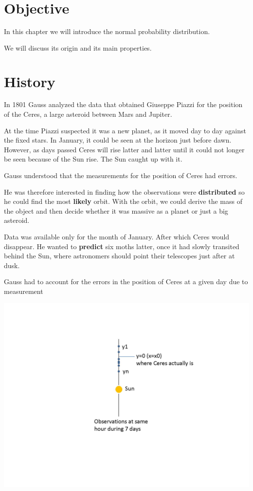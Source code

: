 \documentclass[
]{book}
\begin{document}
\hypertarget{objective-4}{%
\section{Objective}\label{objective-4}}

In this chapter we will introduce the normal probability distribution.

We will discuss its origin and its main properties.

\hypertarget{history}{%
\section{History}\label{history}}

In 1801 Gauss analyzed the data that obtained Giuseppe Piazzi for the position of the Ceres, a large asteroid between Mars and Jupiter.

At the time Piazzi suspected it was a new planet, as it moved day to day against the fixed stars. In January, it could be seen at the horizon just before dawn. However, as days passed Ceres will rise latter and latter until it could not longer be seen because of the Sun rise. The Sun caught up with it.

Gauss understood that the measurements for the position of Ceres had errors.

He was therefore interested in finding how the observations were \textbf{distributed} so he could find the most \textbf{likely} orbit. With the orbit, we could derive the mass of the object and then decide whether it was massive as a planet or just a big asteroid.

Data was available only for the month of January. After which Ceres would disappear. He wanted to \textbf{predict} six moths latter, once it had slowly transited behind the Sun, where astronomers should point their telescopes just after at dusk.

Gauss had to account for the errors in the position of Ceres at a given day due to measurement

\includegraphics{./figures/ceres.JPG}
\end{document}
